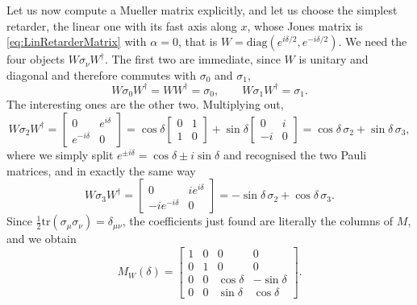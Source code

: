             Let us now compute a Mueller matrix explicitly, and let us choose the simplest retarder, the linear one with its fast axis along $x$, whose Jones matrix is \ref{eq:LinRetarderMatrix} with $\alpha=0$, that is $W=\text{diag}\left(e^{i\delta/2},e^{-i\delta/2}\right)$. We need the four objects $W\sigma_\nu W^{\dagger}$. The first two are immediate, since $W$ is unitary and diagonal and therefore commutes with $\sigma_0$ and $\sigma_1$,
            \begin{equation*}
                W\sigma_0W^{\dagger} = WW^{\dagger} = \sigma_0 , \qquad W\sigma_1W^{\dagger} = \sigma_1 .
            \end{equation*}
            The interesting ones are the other two. Multiplying out,
            \begin{equation*}
                W\sigma_2W^{\dagger} = \begin{bmatrix}0 & e^{i\delta}\\ e^{-i\delta} & 0\end{bmatrix} = \cos\delta\begin{bmatrix}0&1\\1&0\end{bmatrix}+\sin\delta\begin{bmatrix}0&i\\-i&0\end{bmatrix} = \cos\delta\,\sigma_2+\sin\delta\,\sigma_3 ,
            \end{equation*}
            where we simply split $e^{\pm i\delta}=\cos\delta\pm i\sin\delta$ and recognised the two Pauli matrices, and in exactly the same way
            \begin{equation*}
                W\sigma_3W^{\dagger} = \begin{bmatrix}0 & ie^{i\delta}\\ -ie^{-i\delta} & 0\end{bmatrix} = -\sin\delta\,\sigma_2+\cos\delta\,\sigma_3 .
            \end{equation*}
            Since $\tfrac12\text{tr}(\sigma_\mu\sigma_\nu)=\delta_{\mu\nu}$, the coefficients just found are literally the columns of $M$, and we obtain
            \begin{equation}\label{eq:MuellerLinRetarder}
                M_W(\delta) = \begin{bmatrix}
                    1 & 0 & 0 & 0\\
                    0 & 1 & 0 & 0\\
                    0 & 0 & \cos\delta & -\sin\delta\\
                    0 & 0 & \sin\delta & \cos\delta
                \end{bmatrix}.
            \end{equation}

